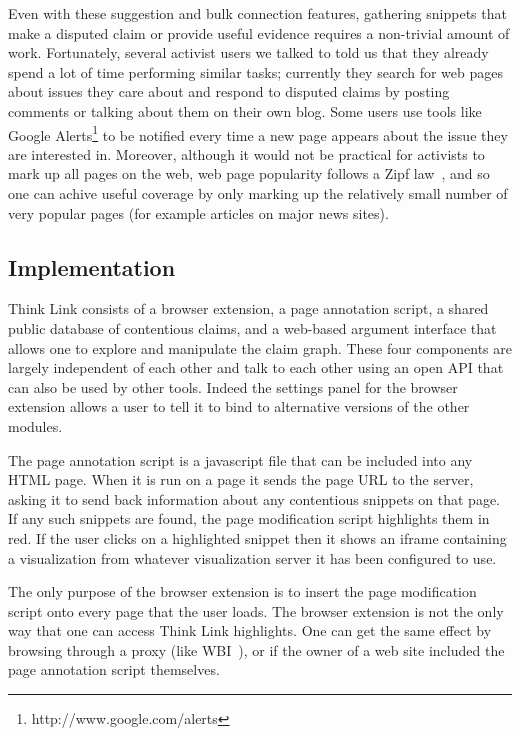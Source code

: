 \documentclass{chi2009}
\newcommand{\todo}[1]{}
\begin{document}
Even with these suggestion and bulk connection features, gathering snippets that make a disputed claim or provide useful evidence requires a non-trivial amount of work. Fortunately, several activist users we talked to told us that they already spend a lot of time performing similar tasks; currently they search for web pages about issues they care about and respond to disputed claims by posting comments or talking about them on their own blog. Some users use tools like Google Alerts\footnote{http://www.google.com/alerts} to be notified every time a new page appears about the issue they are interested in. Moreover, although it would not be practical for activists to mark up all pages on the web, web page popularity follows a Zipf law~\cite{Krashkov2006}, and so one can achive useful coverage by only marking up the relatively small number of very popular pages (for example articles on major news sites).

\todo{Mention about topic previewing}

\todo{Allow two claims to be marked as being identical.}

\todo{BUG: don't have 'add' button for snippets}


\subsection{Implementation}

Think Link consists of a browser extension, a page annotation script, a shared public database of contentious claims, and a web-based argument interface that allows one to explore and manipulate the claim graph. These four components are largely independent of each other and talk to each other using an open API that can also be used by other tools. Indeed the settings panel for the browser extension allows a user to tell it to bind to alternative versions of the other modules.

The page annotation script is a javascript file that can be included into any HTML page. When it is run on a page it sends the page URL to the server, asking it to send back information about any contentious snippets on that page. If any such snippets are found, the page modification script highlights them in red. If the user clicks on a highlighted snippet then it shows an iframe containing a visualization from whatever visualization server it has been configured to use.

The only purpose of the browser extension is to insert the page modification script onto every page that the user loads. The browser extension is not the only way that one can access Think Link highlights. One can get the same effect by browsing through a proxy (like WBI~\cite{Barrett1997}), or if the owner of a web site included the page annotation script themselves.
\end{document}
